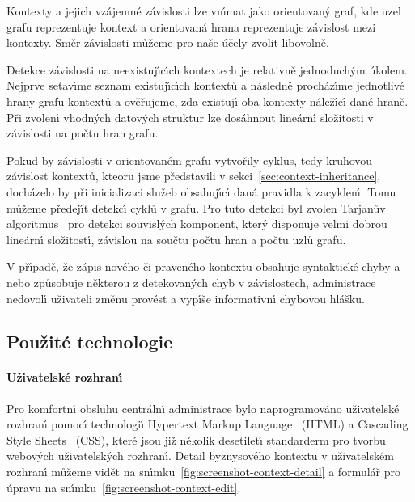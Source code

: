 Kontexty a jejich vzájemné závislosti lze vn\'{\i}mat jako
orientovan\'y graf, kde uzel grafu reprezentuje kontext
a orientovaná hrana reprezentuje závislost mezi kontexty.
Směr závislosti můžeme pro naše účely zvolit libovolně.

Detekce závislosti na neexistuj\'{\i}c\'{\i}ch kontextech je relativně
jednoduch\'ym úkolem. Nejprve setav\'{\i}me seznam existuj\'{\i}c\'{\i}ch kontextů
a následně procház\'{\i}me jednotlivé hrany grafu kontextů a ověřujeme,
zda existuj\'{\i} oba kontexty nálež\'{\i}c\'{\i} dané hraně.
Při zvolen\'{\i} vhodn\'ych datov\'ych struktur lze dosáhnout
lineárn\'{\i} složitosti v závislosti na počtu hran grafu.



Pokud by závislosti v orientovaném grafu vytvořily cyklus, tedy kruhovou závislost
kontextů, kteoru jsme představili v sekci~\ref{sec:context-inheritance},
docházelo by při inicializaci služeb obsahuj\'{\i}c\'{\i} daná pravidla k zacyklen\'{\i}.
Tomu můžeme předej\'{\i}t detekc\'{\i} cyklů v grafu. Pro tuto detekci byl zvolen
Tarjanův algoritmus~\cite{tarjan1971depth} pro detekci souvisl\'ych
komponent, kter\'y disponuje velmi dobrou lineárn\'{\i} složitost\'{\i},
závislou na součtu počtu hran a počtu uzlů grafu.

V př\'{\i}padě, že zápis nového či praveného kontextu obsahuje syntaktické
chyby a nebo způsobuje některou z detekovan\'ych chyb v závislostech,
administrace nedovol\'{\i} uživateli změnu provést a vyp\'{\i}še informativn\'{\i}
chybovou hlášku.

\subsection{Použité technologie}

\paragraph{Uživatelské rozhran\'{\i}}
Pro komfortn\'{\i} obsluhu centráln\'{\i} administrace bylo naprogramováno
uživatelské rozhran\'{\i} pomoc\'{\i} technologi\'{\i} Hypertext Markup Language~\cite{berners1995hypertext}
(HTML) a Cascading Style Sheets~\cite{bos1998cascading} (\gls{CSS}), které jsou již několik
desetilet\'{\i} standarderm pro tvorbu webov\'ych uživatelsk\'ych rozhran\'{\i}.
Detail byznysového kontextu v uživatelském rozhran\'{\i} můžeme vidět na sn\'{\i}mku~\ref{fig:screenshot-context-detail}
a formulář pro úpravu na sn\'{\i}mku~\ref{fig:screenshot-context-edit}.

